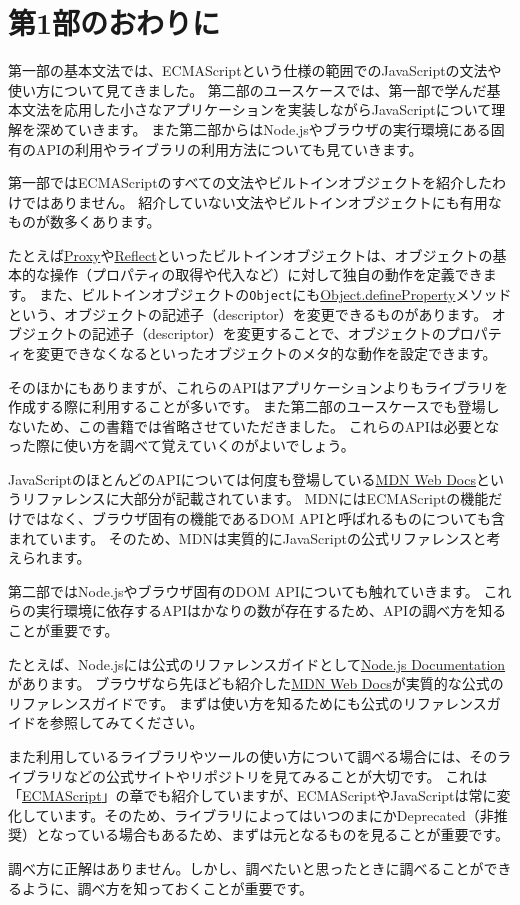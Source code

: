 \hypertarget{end-of-basic-grammar}{%
\chapter*{第1部のおわりに}\label{end-of-basic-grammar}}

第一部の基本文法では、ECMAScriptという仕様の範囲でのJavaScriptの文法や使い方について見てきました。
第二部のユースケースでは、第一部で学んだ基本文法を応用した小さなアプリケーションを実装しながらJavaScriptについて理解を深めていきます。
また第二部からはNode.jsやブラウザの実行環境にある固有のAPIの利用やライブラリの利用方法についても見ていきます。

第一部ではECMAScriptのすべての文法やビルトインオブジェクトを紹介したわけではありません。
紹介していない文法やビルトインオブジェクトにも有用なものが数多くあります。

たとえば\href{https://developer.mozilla.org/ja/docs/Web/JavaScript/Reference/Global_Objects/Proxy}{Proxy}や\href{https://developer.mozilla.org/ja/docs/Web/JavaScript/Reference/Global_Objects/Reflect}{Reflect}といったビルトインオブジェクトは、オブジェクトの基本的な操作（プロパティの取得や代入など）に対して独自の動作を定義できます。
また、ビルトインオブジェクトの\texttt{Object}にも\href{https://developer.mozilla.org/ja/docs/Web/JavaScript/Reference/Global_Objects/Object/defineProperty}{Object.defineProperty}メソッドという、オブジェクトの記述子（descriptor）を変更できるものがあります。
オブジェクトの記述子（descriptor）を変更することで、オブジェクトのプロパティを変更できなくなるといったオブジェクトのメタ的な動作を設定できます。

そのほかにもありますが、これらのAPIはアプリケーションよりもライブラリを作成する際に利用することが多いです。
また第二部のユースケースでも登場しないため、この書籍では省略させていただきました。
これらのAPIは必要となった際に使い方を調べて覚えていくのがよいでしょう。

JavaScriptのほとんどのAPIについては何度も登場している\href{https://developer.mozilla.org/ja/}{MDN
Web Docs}というリファレンスに大部分が記載されています。
MDNにはECMAScriptの機能だけではなく、ブラウザ固有の機能であるDOM
APIと呼ばれるものについても含まれています。
そのため、MDNは実質的にJavaScriptの公式リファレンスと考えられます。

第二部ではNode.jsやブラウザ固有のDOM APIについても触れていきます。
これらの実行環境に依存するAPIはかなりの数が存在するため、APIの調べ方を知ることが重要です。

たとえば、Node.jsには公式のリファレンスガイドとして\href{https://nodejs.org/api/}{Node.js
Documentation}があります。
ブラウザなら先ほども紹介した\href{https://developer.mozilla.org/ja/}{MDN
Web Docs}が実質的な公式のリファレンスガイドです。
まずは使い方を知るためにも公式のリファレンスガイドを参照してみてください。

また利用しているライブラリやツールの使い方について調べる場合には、そのライブラリなどの公式サイトやリポジトリを見てみることが大切です。
これは「\href{../ecmascript/README.md}{ECMAScript}」の章でも紹介していますが、ECMAScriptやJavaScriptは常に変化しています。そのため、ライブラリによってはいつのまにかDeprecated（非推奨）となっている場合もあるため、まずは元となるものを見ることが重要です。

調べ方に正解はありません。しかし、調べたいと思ったときに調べることができるように、調べ方を知っておくことが重要です。
